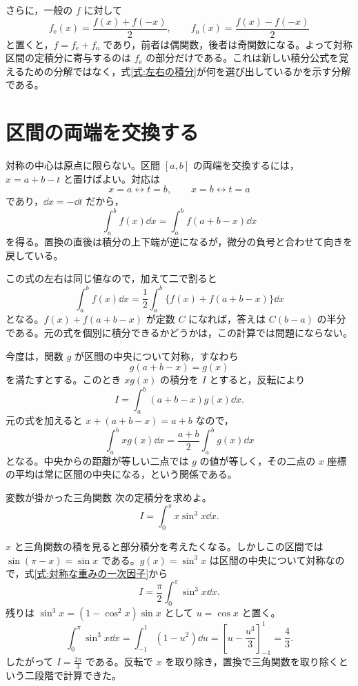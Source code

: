 さらに，一般の $f$ に対して
\[
f_{\mathrm e}(x)=\frac{f(x)+f(-x)}{2},\qquad
f_{\mathrm o}(x)=\frac{f(x)-f(-x)}{2}
\]
と置くと，$f=f_{\mathrm e}+f_{\mathrm o}$ であり，前者は偶関数，後者は奇関数になる。よって対称区間の定積分に寄与するのは $f_{\mathrm e}$ の部分だけである。これは新しい積分公式を覚えるための分解ではなく，式\eqref{式:左右の積分}が何を選び出しているかを示す分解である。

\section{区間の両端を交換する}\label{節:区間の反転}

対称の中心は原点に限らない。区間 $[a,b]$ の両端を交換するには，$x=a+b-t$ と置けばよい。対応は
\[
x=a\longleftrightarrow t=b,\qquad
x=b\longleftrightarrow t=a
\]
であり，$\dd x=-\dd t$ だから，
\begin{equation}\label{式:区間反転}
\int_a^b f(x)\dd x=\int_a^b f(a+b-x)\dd x
\end{equation}
を得る。置換の直後は積分の上下端が逆になるが，微分の負号と合わせて向きを戻している。

この式の左右は同じ値なので，加えて二で割ると
\begin{equation}\label{式:反転平均}
\int_a^b f(x)\dd x
 =\frac12\int_a^b\{f(x)+f(a+b-x)\}\dd x
\end{equation}
となる。$f(x)+f(a+b-x)$ が定数 $C$ になれば，答えは $C(b-a)$ の半分である。元の式を個別に積分できるかどうかは，この計算では問題にならない。

今度は，関数 $g$ が区間の中央について対称，すなわち
\[
g(a+b-x)=g(x)
\]
を満たすとする。このとき $xg(x)$ の積分を $I$ とすると，反転により
\[
I=\int_a^b(a+b-x)g(x)\dd x.
\]
元の式を加えると $x+(a+b-x)=a+b$ なので，
\begin{equation}\label{式:対称な重みの一次因子}
\int_a^b xg(x)\dd x
 =\frac{a+b}{2}\int_a^b g(x)\dd x
\end{equation}
となる。中央からの距離が等しい二点では $g$ の値が等しく，その二点の $x$ 座標の平均は常に区間の中央になる，という関係である。

\begin{example}{変数が掛かった三角関数}
次の定積分を求めよ。
\[
I=\int_0^\pi x\sin^3x\dd x.
\]
\end{example}

$x$ と三角関数の積を見ると部分積分を考えたくなる。しかしこの区間では $\sin(\pi-x)=\sin x$ である。$g(x)=\sin^3x$ は区間の中央について対称なので，式\eqref{式:対称な重みの一次因子}から
\[
I=\frac{\pi}{2}\int_0^\pi\sin^3x\dd x.
\]
残りは $\sin^3x=(1-\cos^2x)\sin x$ として $u=\cos x$ と置く。
\[
\int_0^\pi\sin^3x\dd x
 =\int_{-1}^1(1-u^2)\dd u
 =\left[u-\frac{u^3}{3}\right]_{-1}^1
 =\frac43.
\]
したがって $I=\frac{2\pi}{3}$ である。反転で $x$ を取り除き，置換で三角関数を取り除くという二段階で計算できた。

